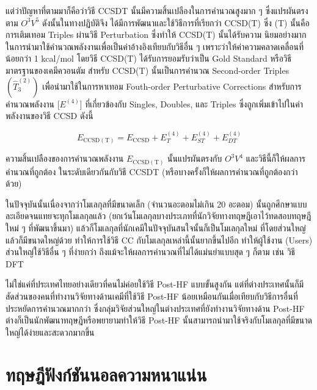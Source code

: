 \noindent แต่ว่าปัญหาที่ตามมาก็คือว่าวิธี CCSDT นั้นมีความสิ้นเปลืองในการคำนวณสูงมาก ๆ ซึ่งแปรผันตรงตาม $O^3V^5$ ดังนั้นในทางปฏิบัติจึง%
ได้มีการพัฒนาและใช้วิธีการที่เรียกว่า CCSD(T) ซึ่ง (T) นั้นคือการเติมเทอม Triples ผ่านวิธี Perturbation ซึ่งทำให้ CCSD(T) นั้นได้รับความ%
นิยมอย่างมากในการนำมาใช้คำนวณพลังงานเพื่อเป็นค่าอ้างอิงเทียบกับวิธีอื่น ๆ เพราะว่าให้ค่าความคลาดเคลื่อนที่น้อยกว่า 1 kcal/mol โดยวิธี
CCSD(T) ได้รับการยอมรับว่าเป็น Gold Standard หรือวิธีมาตรฐานของเคมีควอนตัม สำหรับ CCSD(T) นั้นเป็นการคำนวณ Second-order
Triples $(\hat{T}_3^{(2)})$ เพื่อนำมาใช้ในการหาเทอม Fouth-order Perturbative Corrections สำหรับการคำนวณพลังงาน
[$E^{(4)}$] ที่เกี่ยวข้องกับ Singles, Doubles, และ Triples ซึ่งถูกเพิ่มเข้าไปในค่าพลังงานของวิธี CCSD ดังนี้

\begin{equation}
    E_{\mathrm{CCSD(T)}}
    =
    E_{\mathrm{CCSD}} + E_{T}^{(4)} + E_{ST}^{(4)} + E_{DT}^{(4)}
\end{equation}

\noindent ความสิ้นเปลืองของการคำนวณพลังงาน $E_{\mathrm{CCSD(T)}}$ นั้นแปรผันตรงกับ $O^3V^4$ และวิธีนี้ก็ให้ผลการคำนวณที่ถูกต้อง%
ในระดับเดียวกันกับวิธี CCSDT (หรือบางครั้งก็ให้ผลการคำนวณที่ถูกต้องกว่าด้วย)

ในปัจจุบันนั้นเนื่องจากว่าโมเลกุลที่มีขนาดเล็ก (จำนวนอะตอมไม่เกิน 20 อะตอม) นั้นถูกศึกษาแบบละเอียดจนแทยจะทุกโมเลกุลแล้ว
(ยกเว้นโมเลกุลบางประเภทที่นักวิจัยทางทฤษฎีเอาไว้ทดสอบทฤษฎีใหม่ ๆ ที่พัฒนาขึ้นมา) แล้วก็โมเลกุลที่นักเคมีในปัจจุบันสนใจนั้นก็เป็นโมเลกุลใหม่%
ที่โดยส่วนใหญ่แล้วก็มีขนาดใหญ่ด้วย ทำให้การใช้วิธี CC กับโมเลกุลเหล่านี้นั้นยากขึ้นไปอีก ทำให้ผู้ใช้งาน (Users) ส่วนใหญ่ใช้วิธีอื่น ๆ ที่ง่ายกว่า
ถึงแม้จะให้ผลการคำนวณที่ไม่ได้แม่นยำแบบสุด ๆ ก็ตาม เช่น วิธี DFT

ไม่ใช่แค่ที่ประเทศไทยอย่างเดียวที่คนไม่ค่อยใช้วิธี Post-HF แบบขั้นสูงกัน แต่ที่ต่างประเทศนั้นก็มีสัดส่วนของคนที่ทำงานวิจัยทางด้านเคมีที่ใช้วิธี
Post-HF น้อยเหมือนกันเมื่อเทียบกับวิธีการอื่นที่ประหยัดการคำนวณมากกว่า ซึ่งกลุ่มวิจัยส่วนใหญ่ในต่างประเทศที่ยังทำงานวิจัยทางด้าน Post-HF
ต่างก็เป็นนักพัฒนาทฤษฎีหรือพยายามทำให้วิธี Post-HF นั้นสามารถนำมาใช้จริงกับโมเลกุลที่มีขนาดใหญ่ได้ง่ายและสะดวกมากขึ้น

\section{ทฤษฎีฟังก์ชันนอลความหนาแน่น}

